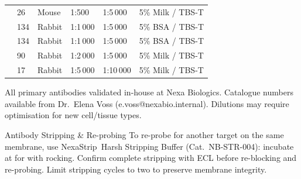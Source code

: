{\begin{longtable}{@{}P{3.0cm}C{1.8cm}C{1.8cm}P{2.2cm}P{2.2cm}P{2.6cm}@{}}
           & 26   & Mouse  & 1:500      & 1:5\,000  & 5\% Milk / TBS-T \\[3pt]
            & 134  & Rabbit & 1:1\,000   & 1:5\,000  & 5\% BSA / TBS-T \\[3pt]
   & 134 & Rabbit & 1:1\,000 & 1:5\,000  & 5\% BSA / TBS-T \\[3pt]
           & 90   & Rabbit & 1:2\,000   & 1:5\,000  & 5\% Milk / TBS-T \\[3pt]
      & 17   & Rabbit & 1:5\,000   & 1:10\,000 & 5\% Milk / TBS-T \\
\end{longtable}
}

\par\vspace{2pt}
{\footnotesize\color{GrayMid}
All primary antibodies validated in-house at Nexa Biologics. Catalogue numbers
available from Dr.~Elena Voss (e.voss@nexabio.internal). Dilutions may require
optimisation for new cell/tissue types.}

\par\vspace{6pt}
\begin{tipbox}{Antibody Stripping \& Re-probing}
To re-probe for another target on the same membrane, use NexaStrip\texttrademark\
Harsh Stripping Buffer (Cat.\ NB-STR-004): incubate at  for 
with rocking. Confirm complete stripping with ECL before re-blocking and re-probing.
Limit stripping cycles to two to preserve membrane integrity.
\end{tipbox}
